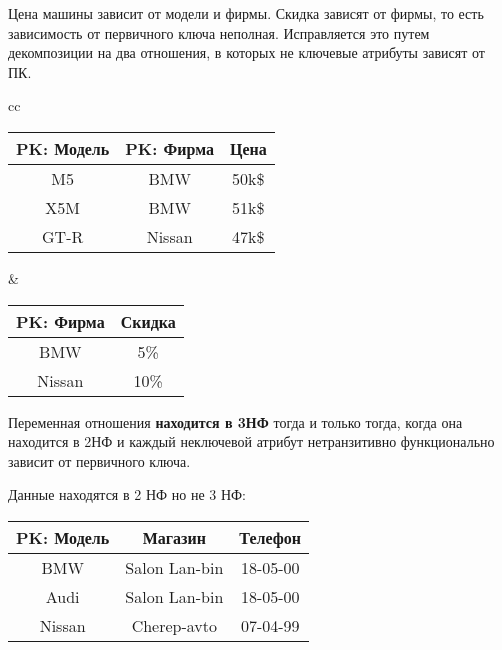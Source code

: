 Цена машины зависит от модели и фирмы. Скидка зависят от фирмы, то есть зависимость от первичного ключа неполная. Исправляется это путем декомпозиции на два отношения, в которых не ключевые атрибуты зависят от ПК.

\begin{tabular}{cc}
    \begin{minipage}{.55\linewidth}
    
        \begin{tabular}{|c|c|c|}
            \hline
            \textbf{PK: Модель} & \textbf{PK: Фирма} & Цена \\
            \hline
            \hline
            M5  & BMW     & 50k\$ \\
            \hline
            X5M & BMW     & 51k\$ \\
            \hline
            GT-R & Nissan & 47k\$ \\
            \hline
        \end{tabular}

    \end{minipage} &
    \begin{minipage}{.55\linewidth}
    
        \begin{tabular}{|c|c|}
            \hline
            \textbf{PK: Фирма} & Скидка \\
            \hline
            \hline
            BMW     & 5\% \\
            \hline
            Nissan  & 10\% \\
            \hline
        \end{tabular}
        
    \end{minipage} 
\end{tabular}

\bigbreak

Переменная отношения \textbf{находится в 3НФ} тогда и только тогда, когда она находится в 2НФ и каждый неключевой атрибут нетранзитивно функционально зависит от первичного ключа. 

Данные находятся в 2 НФ но не 3 НФ:

\begin{tabular}{|c|c|c|}
    \hline
    \textbf{PK: Модель} & Магазин & Телефон \\
    \hline
    \hline
    BMW    & Salon Lan-bin & 18-05-00 \\
    \hline
    Audi   & Salon Lan-bin & 18-05-00 \\
    \hline
    Nissan & Cherep-avto   & 07-04-99 \\
    \hline
\end{tabular}

